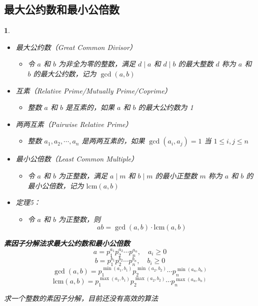 \documentclass[UTF8]{report}
\theoremstyle{MyLineTheoremStyle} %
\theoremstyle{MyBlockTheoremStyle} %
\theoremstyle{MySubsubsectionStyle} %
\newtheorem{definition}{}
\begin{document}
\subsection{最大公约数和最小公倍数}

\begin{definition}
    \begin{itemize}
        \item 最大公约数（Great Common Divisor）
        \begin{itemize}
            \item 令 $a$ 和 $b$ 为非全为零的整数，满足 $d \mid a$ 和 $d \mid b$ 的最大整数 $d$ 称为 $a$ 和 $b$ 的最大公约数，记为 $\gcd(a, b)$
        \end{itemize}
        \item 互素（Relative Prime/Mutually Prime/Coprime）
        \begin{itemize}
            \item 整数 $a$ 和 $b$ 是互素的，如果 $a$ 和 $b$ 的最大公约数为 1
        \end{itemize}
        \item 两两互素（Pairwise Relative Prime）
        \begin{itemize}
            \item 整数 $a_1, a_2, \cdots, a_n$ 是两两互素的，如果 $\gcd(a_i, a_j) = 1$ 当 $1 \leq i,j \leq n$
        \end{itemize}
        \item 最小公倍数（Least Common Multiple）
        \begin{itemize}
            \item 令 $a$ 和 $b$ 为正整数，满足 $a \mid m$ 和 $b \mid m$ 的最小正整数 $m$ 称为 $a$ 和 $b$ 的最小公倍数，记为 $\mathrm{lcm}(a, b)$
        \end{itemize}
        \item 定理5：
        \begin{itemize}
            \item 令 $a$ 和 $b$ 为正整数，则
            \[
            ab = \gcd(a, b) \cdot \mathrm{lcm}(a, b)
            \]
        \end{itemize}
    \end{itemize}

    \textbf{素因子分解法求最大公约数和最小公倍数}
    \[
    a = p_1^{a_1} p_2^{a_2} \cdots p_n^{a_n}, \quad a_i \geq 0
    \]
    \[
    b = p_1^{b_1} p_2^{b_2} \cdots p_n^{b_n}, \quad b_i \geq 0
    \]
    \[
    \gcd(a, b) = p_1^{\min(a_1, b_1)} p_2^{\min(a_2, b_2)} \cdots p_n^{\min(a_n, b_n)}
    \]
    \[
    \mathrm{lcm}(a, b) = p_1^{\max(a_1, b_1)} p_2^{\max(a_2, b_2)} \cdots p_n^{\max(a_n, b_n)}
    \]
    \item 求一个整数的素因子分解，目前还没有高效的算法
\end{definition}
\end{document}
